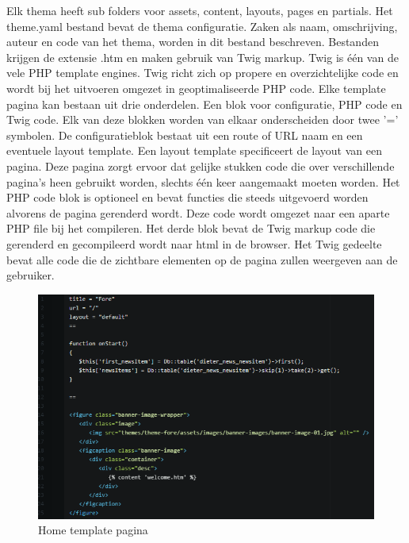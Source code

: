 \pagebreak
\noindent
Elk thema heeft sub folders voor assets, content, layouts, pages en partials. Het theme.yaml bestand bevat de thema configuratie. Zaken als naam, omschrijving, auteur en code van het thema, worden in dit bestand beschreven. Bestanden krijgen de extensie .htm en maken gebruik van Twig markup. Twig is één van de vele PHP template engines. Twig richt zich op propere en overzichtelijke code en wordt bij het uitvoeren omgezet in geoptimaliseerde PHP code. 
\newline\newline
Elke template pagina kan bestaan uit drie onderdelen. Een blok voor configuratie, PHP code en Twig code. Elk van deze blokken worden van elkaar onderscheiden door twee '=' symbolen.  De configuratieblok bestaat uit een route of URL naam en een eventuele layout template. Een layout template specificeert de layout van een pagina. Deze pagina zorgt ervoor dat gelijke stukken code die over verschillende pagina's heen gebruikt worden, slechts één keer aangemaakt moeten worden. Het PHP code blok is optioneel en bevat functies die steeds uitgevoerd worden alvorens de pagina gerenderd wordt. Deze code wordt omgezet naar een aparte PHP file bij het compileren. Het derde blok bevat de Twig markup code die gerenderd en gecompileerd wordt naar html in de browser. Het Twig gedeelte bevat alle code die de zichtbare elementen op de pagina zullen weergeven aan de gebruiker.

\begin{figure}[!ht]
  \includegraphics[width=\textwidth]{img/screen-homepage.png}
  \centering
  \caption{Home template pagina}
  \label{fig:Home template pagina}
\end{figure}

